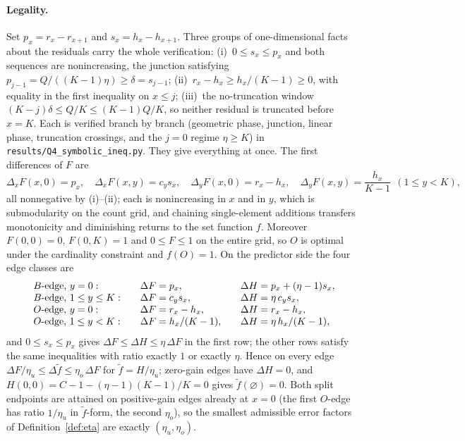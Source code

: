 \paragraph{Legality.}
Set $p_x=r_x-r_{x+1}$ and $s_x=h_x-h_{x+1}$.  Three groups of
one-dimensional facts about the residuals carry the whole verification:
(i)~$0\le s_x\le p_x$ and both sequences are nonincreasing, the junction
satisfying $p_{j-1}=Q/((K-1)\eta)\ge\delta=s_{j-1}$;
(ii)~$r_x-h_x\ge h_x/(K-1)\ge0$, with equality in the first inequality on
$x\le j$; (iii)~the no-truncation window
$(K-j)\delta\le Q/K\le(K-1)Q/K$, so neither residual is truncated before
$x=K$.  Each is verified branch by branch (geometric phase, junction,
linear phase, truncation crossings, and the $j=0$ regime $\eta\ge K$) in
\texttt{results/Q4\_symbolic\_ineq.py}.  They give everything at once.
The first differences of $F$ are
\[
  \Delta_xF(x,0)=p_x,\quad
  \Delta_xF(x,y)=c_y s_x,\quad
  \Delta_yF(x,0)=r_x-h_x,\quad
  \Delta_yF(x,y)=\frac{h_x}{K-1}\ \ (1\le y<K),
\]
all nonnegative by (i)--(ii); each is nonincreasing in $x$ and in $y$,
which is submodularity on the count grid, and chaining single-element
additions transfers monotonicity and diminishing returns to the set
function $f$.  Moreover $F(0,0)=0$, $F(0,K)=1$ and $0\le F\le1$ on the
entire grid, so $O$ is optimal under the cardinality constraint and
$f(O)=1$.  On the predictor side the four edge classes are
\[
  \begin{array}{l@{\qquad}l@{\qquad}l}
    \text{$B$-edge, }y=0: & \Delta F=p_x, & \Delta H=p_x+(\eta-1)s_x,\\
    \text{$B$-edge, }1\le y\le K: & \Delta F=c_y s_x, & \Delta H=\eta\,c_y s_x,\\
    \text{$O$-edge, }y=0: & \Delta F=r_x-h_x, & \Delta H=r_x-h_x,\\
    \text{$O$-edge, }1\le y<K: & \Delta F=h_x/(K-1), & \Delta H=\eta\,h_x/(K-1),
  \end{array}
\]
and $0\le s_x\le p_x$ gives $\Delta F\le\Delta H\le\eta\,\Delta F$ in the
first row; the other rows satisfy the same inequalities with ratio exactly
$1$ or exactly $\eta$.  Hence on every edge
$\Delta F/\eta_u\le\Delta\tilde f\le\eta_o\,\Delta F$ for
$\tilde f=H/\eta_u$; zero-gain edges have $\Delta H=0$, and
$H(0,0)=C-1-(\eta-1)(K-1)/K=0$ gives $\tilde f(\varnothing)=0$.  Both
split endpoints are attained on positive-gain edges already at $x=0$ (the
first $O$-edge has ratio $1/\eta_u$ in $\tilde f$-form, the second
$\eta_o$), so the smallest admissible error factors of
Definition~\ref{def:eta} are exactly $(\eta_u,\eta_o)$.

